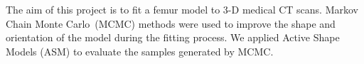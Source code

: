 The aim of this project is to fit a femur model to 3-D medical CT scans.
Markov Chain Monte Carlo~(MCMC) methods were used to improve the shape and orientation of the model during the fitting process.
We applied Active Shape Models (ASM) to evaluate the samples generated by MCMC.
